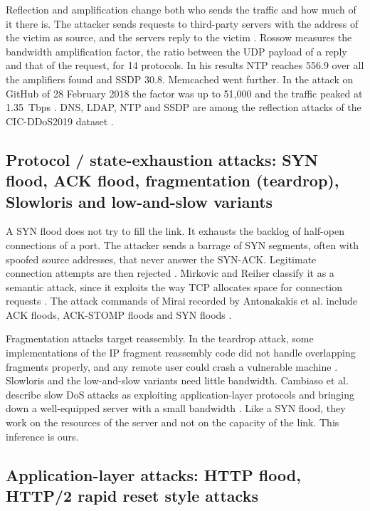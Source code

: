 Reflection and amplification change both who sends the traffic and how much
of it there is. The attacker sends requests to third-party servers with the
address of the victim as source, and the servers reply to the victim
\citep{rossow2014amplification}. Rossow measures the bandwidth amplification
factor, the ratio between the UDP payload of a reply and that of the request,
for 14 protocols. In his results NTP reaches 556.9 over all the amplifiers
found and SSDP 30.8. Memcached went further. In the attack on GitHub of 28
February 2018 the factor was up to 51{,}000 and the traffic peaked at
1.35~Tbps \citep{kottler2018github}. DNS, LDAP, NTP and SSDP are among the
reflection attacks of the CIC-DDoS2019 dataset \citep{cic2019ddos}.

\subsection{Protocol / state-exhaustion attacks: SYN flood, ACK flood, fragmentation (teardrop), Slowloris and low-and-slow variants}
\label{sec:state-exhaustion-attacks}

A SYN flood does not try to fill the link. It exhausts the backlog of
half-open connections of a port. The attacker sends a barrage of SYN
segments, often with spoofed source addresses, that never answer the SYN-ACK.
Legitimate connection attempts are then rejected \citep{eddy2007rfc4987}.
Mirkovic and Reiher classify it as a semantic attack, since it exploits the
way TCP allocates space for connection requests
\citep{mirkovic2004taxonomy}. The attack commands of Mirai recorded by
Antonakakis et al. include ACK floods, ACK-STOMP floods and SYN floods
\citep{antonakakis2017mirai}.

Fragmentation attacks target reassembly. In the teardrop attack, some
implementations of the IP fragment reassembly code did not handle
overlapping fragments properly, and any remote user could crash a vulnerable
machine \citep{cert1997teardrop}.
Slowloris and the low-and-slow variants need little bandwidth. Cambiaso et
al. describe slow DoS attacks as exploiting application-layer protocols and
bringing down a well-equipped server with a small bandwidth
\citep{cambiaso2013slow}. Like a SYN flood, they work on the resources of the
server and not on the capacity of the link. This inference is ours.

\subsection{Application-layer attacks: HTTP flood, HTTP/2 rapid reset style attacks}
\label{sec:application-layer-attacks}

